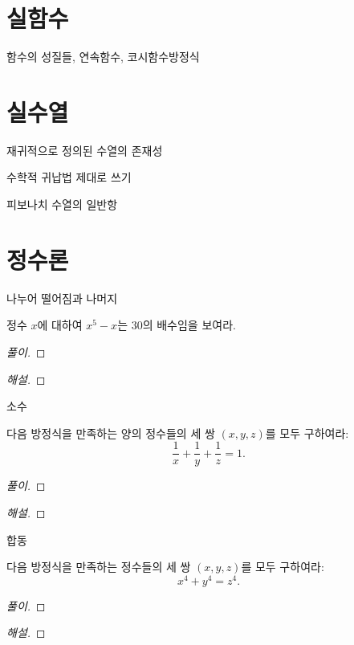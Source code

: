 \documentclass{../../large}
\begin{document}
\section{실함수}

함수의 성질들, 연속함수, 코시함수방정식



\section{실수열}

재귀적으로 정의된 수열의 존재성

수학적 귀납법 제대로 쓰기

피보나치 수열의 일반항


\section{정수론}


나누어 떨어짐과 나머지

\begin{example}
정수 $x$에 대하여 $x^5-x$는 $30$의 배수임을 보여라.
\end{example}
\begin{linenumbers*}
\begin{proof}[풀이]
\end{proof}
\end{linenumbers*}
\begin{proof}[해설]
\end{proof}


소수



\begin{example}
다음 방정식을 만족하는 양의 정수들의 세 쌍 $(x,y,z)$를 모두 구하여라:
\[\frac1x+\frac1y+\frac1z=1.\]
\end{example}
\begin{linenumbers*}
\begin{proof}[풀이]
\end{proof}
\end{linenumbers*}
\begin{proof}[해설]
\end{proof}

합동

\begin{example}
다음 방정식을 만족하는 정수들의 세 쌍 $(x,y,z)$를 모두 구하여라:
\[x^4+y^4=z^4.\]
\end{example}
\begin{linenumbers*}
\begin{proof}[풀이]
\end{proof}
\end{linenumbers*}
\begin{proof}[해설]
\end{proof}
\end{document}
